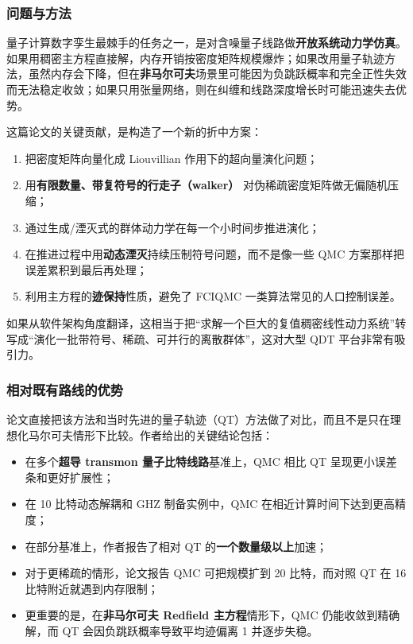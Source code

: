 \documentclass[11pt,a4paper]{article}
\newcommand{\QDT}{QDT}
\begin{document}
\subsubsection{问题与方法}

量子计算数字孪生最棘手的任务之一，是对含噪量子线路做\textbf{开放系统动力学仿真}。如果用稠密主方程直接解，内存开销按密度矩阵规模爆炸；如果改用量子轨迹方法，虽然内存会下降，但在\textbf{非马尔可夫}场景里可能因为负跳跃概率和完全正性失效而无法稳定收敛；如果只用张量网络，则在纠缠和线路深度增长时可能迅速失去优势。

这篇论文的关键贡献，是构造了一个新的折中方案：

\begin{enumerate}
  \item 把密度矩阵向量化成 Liouvillian 作用下的超向量演化问题；
  \item 用\textbf{有限数量、带复符号的行走子（walker）} 对伪稀疏密度矩阵做无偏随机压缩；
  \item 通过生成/湮灭式的群体动力学在每一个小时间步推进演化；
  \item 在推进过程中用\textbf{动态湮灭}持续压制符号问题，而不是像一些 QMC 方案那样把误差累积到最后再处理；
  \item 利用主方程的\textbf{迹保持}性质，避免了 FCIQMC 一类算法常见的人口控制误差。
\end{enumerate}

如果从软件架构角度翻译，这相当于把“求解一个巨大的复值稠密线性动力系统”转写成“演化一批带符号、稀疏、可并行的离散群体”，这对大型 \QDT{} 平台非常有吸引力。

\subsubsection{相对既有路线的优势}

论文直接把该方法和当时先进的量子轨迹（QT）方法做了对比，而且不是只在理想化马尔可夫情形下比较。作者给出的关键结论包括：

\begin{itemize}
  \item 在多个\textbf{超导 transmon 量子比特线路}基准上，QMC 相比 QT 呈现更小误差条和更好扩展性；
  \item 在 10 比特动态解耦和 GHZ 制备实例中，QMC 在相近计算时间下达到更高精度；
  \item 在部分基准上，作者报告了相对 QT 的\textbf{一个数量级以上}加速；
  \item 对于更稀疏的情形，论文报告 QMC 可把规模扩到 20 比特，而对照 QT 在 16 比特附近就遇到内存限制；
  \item 更重要的是，在\textbf{非马尔可夫 Redfield 主方程}情形下，QMC 仍能收敛到精确解，而 QT 会因负跳跃概率导致平均迹偏离 1 并逐步失稳。
\end{itemize}
\end{document}
